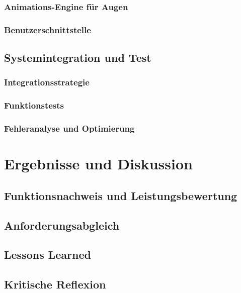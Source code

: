 \subsection{Animations-Engine für Augen}
\subsection{Benutzerschnittstelle}

\section{Systemintegration und Test}
\subsection{Integrationsstrategie}
\subsection{Funktionstests}
\subsection{Fehleranalyse und Optimierung}

\chapter{Ergebnisse und Diskussion}
\section{Funktionsnachweis und Leistungsbewertung}
\section{Anforderungsabgleich}
\section{Lessons Learned}
\section{Kritische Reflexion}



%
%
